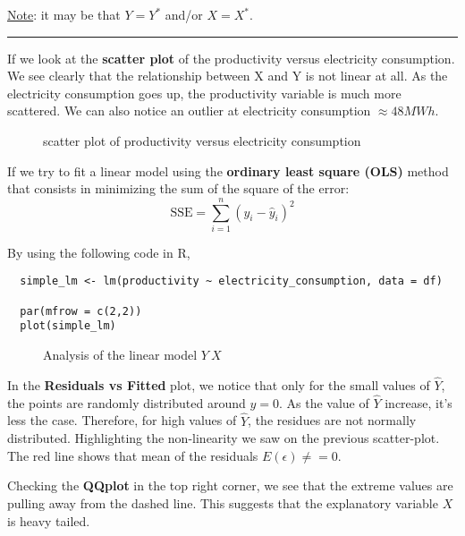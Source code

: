 \documentclass[10pt, a4paper, nofootinbib]{scrartcl}
\begin{document}
\underline{Note}: it may be that $Y = Y^{\ast}$ and/or $X = X^{\ast}$.

\begin{center}\rule{6cm}{0.4pt}\end{center}

If we look at the \textbf{scatter plot} of the productivity versus electricity consumption. We see clearly that the relationship between X and Y is not linear at all. As the electricity consumption goes up, the productivity variable is much more scattered. We can also notice an outlier at electricity consumption $\approx 48MWh$.

\begin{figure}[H]
  \centering
  
  \caption{scatter plot of productivity versus electricity consumption}
  \label{fig:scatter_plot}
\end{figure}

If we try to fit a linear model using the \textbf{ordinary least square (OLS)} method that consists in minimizing the sum of the square of the error: 
\begin{equation}
  \text{SSE} = \sum_{i = 1}^{n} (y_i - \hat{y}_i)^2
\end{equation}

By using the following code in R, 
\begin{verbatim}
  simple_lm <- lm(productivity ~ electricity_consumption, data = df)

  par(mfrow = c(2,2))
  plot(simple_lm)
\end{verbatim}

\begin{figure}[H]
  \centering
  
  \caption{Analysis of the linear model $Y ~ X$}
  \label{fig:analysis-linear-model}
\end{figure}

In the \textbf{Residuals vs Fitted} plot, we notice that only for the small values of $\hat{Y}$, the points are randomly distributed around $y = 0$. As the value of $\hat{Y}$ increase, it's less the case. Therefore, for high values of $\hat{Y}$, the residues are not normally distributed. Highlighting the non-linearity we saw on the previous scatter-plot. The red line shows that mean of the residuals $E(\epsilon) \neq = 0$.

Checking the \textbf{QQplot} in the top right corner, we see that the extreme values are pulling away from the dashed line. This suggests that the explanatory variable $X$ is heavy tailed. 
\end{document}

